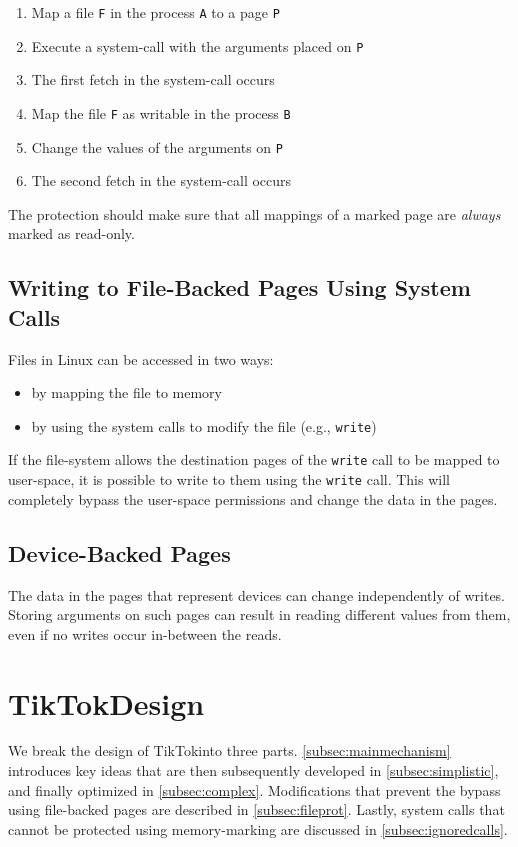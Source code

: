 \documentclass[conference]{IEEEtran}
\newcommand{\sysname}{TikTok}
\begin{document}
\begin{enumerate}
  \item Map a file \texttt{F} in the process \texttt{A} to a page \texttt{P}
  \item Execute a system-call with the arguments placed on \texttt{P}
  \item The first fetch in the system-call occurs
  \item Map the file \texttt{F} as writable in the process \texttt{B}
  \item Change the values of the arguments on \texttt{P}
  \item The second fetch in the system-call occurs
\end{enumerate}

The protection should make sure that all mappings of a marked page are \emph{always}
marked as read-only.

\subsection{Writing to File-Backed Pages Using System Calls}

Files in Linux can be accessed in two ways:
\begin{itemize}
    \item by mapping the file to memory
    \item by using the system calls to modify the file (e.g., \texttt{write})
\end{itemize}

If the file-system allows the destination pages of the \texttt{write} call to be
mapped to user-space, it is possible to write to them using the \texttt{write}
call. This will completely bypass the user-space permissions and change the data
in the pages.

\subsection{Device-Backed Pages}

The data in the pages that represent devices can change independently of writes.
Storing arguments on such pages can result in reading different values from them,
even if no writes occur in-between the reads.

\section{\sysname Design}
\label{sec:design}

We break the design of \sysname into three parts. 
\autoref{subsec:mainmechanism} introduces key ideas that are then
subsequently developed in \autoref{subsec:simplistic}, and finally optimized in
\autoref{subsec:complex}. Modifications that prevent the bypass using
file-backed pages are described in \autoref{subsec:fileprot}. Lastly, system
calls that cannot be protected using memory-marking are discussed in
\autoref{subsec:ignoredcalls}.
\end{document}
